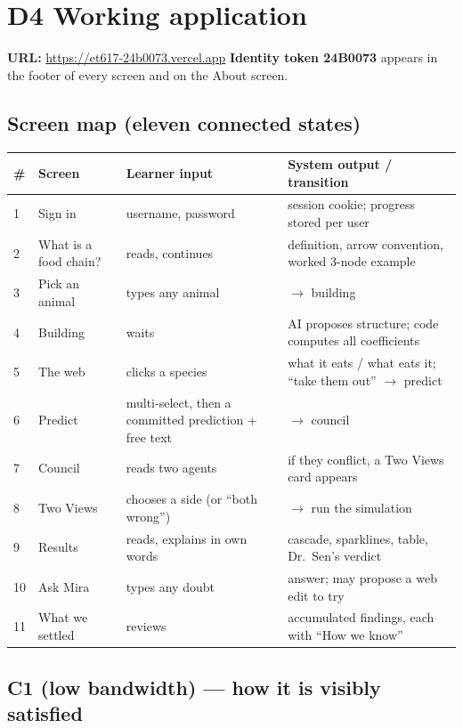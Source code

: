 \documentclass[11pt,a4paper]{article}
\newcommand{\id}{24B0073}
\begin{document}
\section{D4 \quad Working application}

\textbf{URL:} \url{https://et617-24b0073.vercel.app} \qquad
\textbf{Identity token \id{}} appears in the footer of every screen and on the About screen.

\subsection*{Screen map (eleven connected states)}

\begin{longtable}{@{}p{0.5cm}p{2.6cm}p{5.2cm}p{6.6cm}@{}}
\toprule
\textbf{\#} & \textbf{Screen} & \textbf{Learner input} & \textbf{System output / transition}\\
\midrule
\endhead
1 & Sign in & username, password & session cookie; progress stored per user\\
2 & What is a food chain? & reads, continues & definition, arrow convention, worked 3-node example\\
3 & Pick an animal & types any animal & $\rightarrow$ building\\
4 & Building & waits & AI proposes structure; code computes all coefficients\\
5 & The web & clicks a species & what it eats / what eats it; ``take them out'' $\rightarrow$ predict\\
6 & Predict & multi-select, then a committed prediction + free text & $\rightarrow$ council\\
7 & Council & reads two agents & if they conflict, a Two Views card appears\\
8 & Two Views & chooses a side (or ``both wrong'') & $\rightarrow$ run the simulation\\
9 & Results & reads, explains in own words & cascade, sparklines, table, Dr.\ Sen's verdict\\
10 & Ask Mira & types any doubt & answer; may propose a web edit to try\\
11 & What we settled & reviews & accumulated findings, each with ``How we know''\\
\bottomrule
\end{longtable}

\subsection*{C1 (low bandwidth) --- how it is visibly satisfied}
\end{document}
